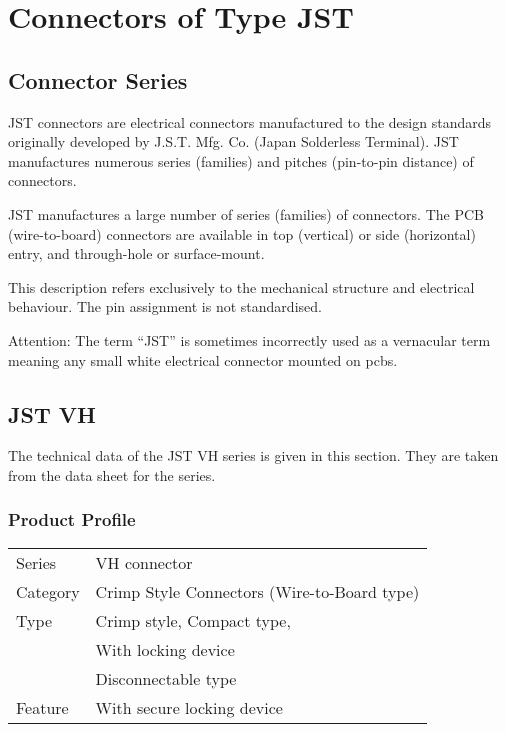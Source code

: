 %
%
%

\chapter{Connectors of Type JST}


\section{Connector Series}

JST connectors are electrical connectors manufactured to the design standards originally developed by J.S.T. Mfg. Co. (Japan Solderless Terminal).\cite{JST:2016} JST manufactures numerous series (families) and pitches (pin-to-pin distance) of connectors.


JST manufactures a large number of series (families) of connectors. The PCB (wire-to-board) connectors are available in top (vertical) or side (horizontal) entry, and through-hole or surface-mount. \cite{JST:2020}

This description refers exclusively to the mechanical structure and electrical behaviour. The pin assignment is not standardised.

Attention: The term ``JST'' is sometimes incorrectly used as a vernacular term meaning any small white electrical connector mounted on \ac{pcb}s.




\section{JST VH}


The technical data of the JST VH series is given in this section. They are taken from the data sheet for the series. \cite{JST:2021}

\subsection{Product Profile}


\begin{tabular}{ll}
  Series   & VH connector \\
  Category & Crimp Style Connectors (Wire-to-Board type) \\
  Type     & Crimp style, Compact type, \\
           & With locking device\\
           & Disconnectable type \\
  Feature  & With secure locking device\\
\end{tabular}

